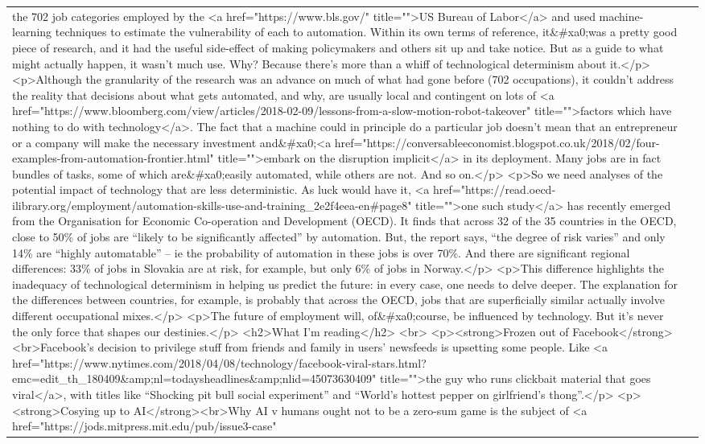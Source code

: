 \documentclass[]{article}
\begin{document}
\begin{table}[!h]
{\begin{tabular}[t]{ll}
the 702 job categories employed by the <a href="https://www.bls.gov/" title="">US Bureau of Labor</a> and used machine-learning techniques to estimate the vulnerability of each to automation. Within its own terms of reference, it\&\#xa0;was a pretty good piece of research, and it had the useful side-effect of making policymakers and others sit up and take notice. But as a guide to what might actually happen, it wasn’t much use. Why? Because there’s more than a whiff of technological determinism about it.</p> <p>Although the granularity of the research was an advance on much of what had gone before (702 occupations), it couldn’t address the reality that decisions about what gets automated, and why, are usually local and contingent on lots of <a href="https://www.bloomberg.com/view/articles/2018-02-09/lessons-from-a-slow-motion-robot-takeover" title="">factors which have nothing to do with technology</a>. The fact that a machine could in principle do a particular job doesn’t mean that an entrepreneur or a company will make the necessary investment and\&\#xa0;<a href="https://conversableeconomist.blogspot.co.uk/2018/02/four-examples-from-automation-frontier.html" title="">embark on the disruption implicit</a> in its deployment. Many jobs are in fact bundles of tasks, some of which are\&\#xa0;easily automated, while others are not. And so on.</p> <p>So we need analyses of the potential impact of technology that are less deterministic. As luck would have it, <a href="https://read.oecd-ilibrary.org/employment/automation-skills-use-and-training\_2e2f4eea-en\#page8" title="">one such study</a> has recently emerged from the Organisation for Economic Co-operation and Development (OECD). It finds that across 32 of the 35 countries in the OECD, close to 50\% of jobs are “likely to be significantly affected” by automation. But, the report says, “the degree of risk varies” and only 14\% are “highly automatable” – ie the probability of automation in these jobs is over 70\%. And there are significant regional differences: 33\% of jobs in Slovakia are at risk, for example, but only 6\% of jobs in Norway.</p> <p>This difference highlights the inadequacy of technological determinism in helping us predict the future: in every case, one needs to delve deeper. The explanation for the differences between countries, for example, is probably that across the OECD, jobs that are superficially similar actually involve different occupational mixes.</p> <p>The future of employment will, of\&\#xa0;course, be influenced by technology. But it’s never the only force that shapes our destinies.</p> <h2>What I’m reading</h2> <br> <p><strong>Frozen out of Facebook</strong><br>Facebook’s decision to privilege stuff from friends and family in users’ newsfeeds is upsetting some people. Like <a href="https://www.nytimes.com/2018/04/08/technology/facebook-viral-stars.html?emc=edit\_th\_180409\&amp;nl=todaysheadlines\&amp;nlid=45073630409" title="">the guy who runs clickbait material that goes viral</a>, with titles like “Shocking pit bull social experiment” and “World’s hottest pepper on girlfriend’s thong”.</p> <p><strong>Cosying up to AI</strong><br>Why AI v humans ought not to be a zero-sum game is the subject of <a href="https://jods.mitpress.mit.edu/pub/issue3-case" 
\end{tabular}}
\end{table}
\end{document}
